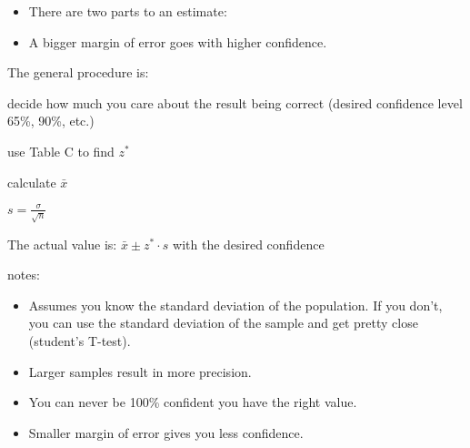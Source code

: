 \documentclass[letterpaper, landscape]{exam}
\begin{document}
  \begin{itemize}
    \item There are two parts to an estimate:

    \item A bigger margin of error goes with higher confidence.

  \end{itemize}

  The general procedure is:
  \begin{enumerate*}
    \item decide how much you care about the result being correct (desired
      confidence level 65\%, 90\%, etc.)

    \item use Table C to find $z^*$

    \item calculate $\bar{x}$

    \item $s = \frac{\sigma}{\sqrt{n}}$

    \item The actual value is: $\bar{x} \pm z^* \cdot s$ with the desired
      confidence

  \end{enumerate*}

  notes:
  \begin{itemize}
    \item Assumes you know the standard deviation of the population. If you
      don't, you can use the standard deviation of the sample and get pretty
      close (student's T-test).

    \item Larger samples result in more precision.

    \item You can never be 100\% confident you have the right value.

    \item Smaller margin of error gives you less confidence.
  \end{itemize}
\end{document}
